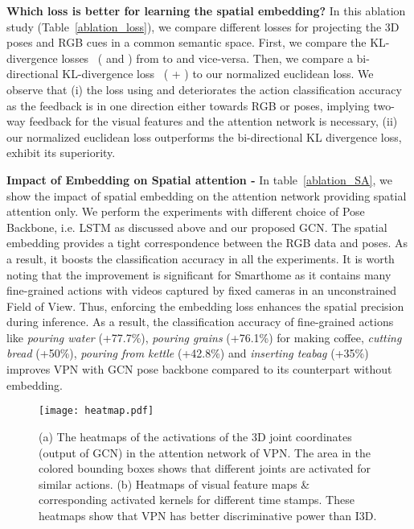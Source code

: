 \documentclass[runningheads]{llncs}
\begin{document}
\noindent \textbf{Which loss is better for learning the spatial embedding?} In this ablation study (Table~\ref{ablation_loss}), we compare different losses for projecting the 3D poses and RGB cues in a common semantic space. First, we compare the KL-divergence losses~\cite{uni_KL_1,uni_KL_2} ( and ) from  to  and vice-versa. Then, we compare a bi-directional KL-divergence loss~\cite{bi_KL_1,bi_KL_2,bi_KL_3} ( + ) to our normalized euclidean loss. We observe that (i) the loss using  and  deteriorates the action classification accuracy as the feedback is in one direction either towards RGB or poses, implying two-way feedback for the visual features and the attention network is necessary, (ii) our normalized euclidean loss outperforms the bi-directional KL divergence loss, exhibit its superiority. 

\noindent \textbf{Impact of Embedding on Spatial attention -} In table~\ref{ablation_SA}, we show the impact of spatial embedding on the attention network providing spatial attention only. We perform the experiments with different choice of Pose Backbone, i.e. LSTM as discussed above and our proposed GCN. The spatial embedding provides a tight correspondence between the RGB data and poses. As a result, it boosts the classification accuracy in all the experiments. It is worth noting that the improvement is significant for Smarthome as it contains many fine-grained actions with videos captured by fixed cameras in an unconstrained Field of View. Thus, enforcing the embedding loss enhances the spatial precision during inference. As a result, the classification accuracy of fine-grained actions like \textit{pouring water} (+77.7\%), \textit{pouring grains} (+76.1\%) for making coffee, \textit{cutting bread} (+50\%), \textit{pouring from kettle} (+42.8\%) and \textit{inserting teabag} (+35\%) improves VPN with GCN pose backbone compared to its counterpart without embedding.

\begin{figure}
\centering
\texttt{[image: heatmap.pdf]}
\caption{ (a) The heatmaps of the activations of the 3D joint coordinates (output of GCN) in the attention network of VPN. The area in the colored bounding boxes shows that different joints are activated for similar actions. (b) Heatmaps of visual feature maps \& corresponding activated kernels for different time stamps. These heatmaps show that VPN has better discriminative power than I3D.}\vspace{-1em}
\label{heatmap}
\end{figure}
\end{document}
